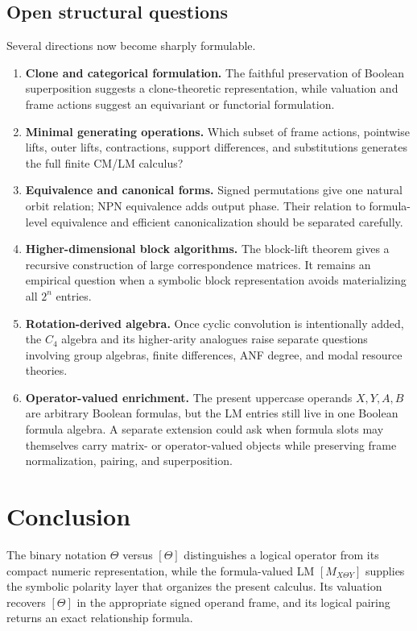 \documentclass[11pt]{article}
\theoremstyle{definition}
\theoremstyle{remark}
\begin{document}
\subsection{Open structural questions}

Several directions now become sharply formulable.
\begin{enumerate}
  \item \textbf{Clone and categorical formulation.}  The faithful preservation of Boolean superposition suggests a clone-theoretic representation, while valuation and frame actions suggest an equivariant or functorial formulation.
  \item \textbf{Minimal generating operations.}  Which subset of frame actions, pointwise lifts, outer lifts, contractions, support differences, and substitutions generates the full finite CM/LM calculus?
  \item \textbf{Equivalence and canonical forms.}  Signed permutations give one natural orbit relation; NPN equivalence adds output phase.  Their relation to formula-level equivalence and efficient canonicalization should be separated carefully.
  \item \textbf{Higher-dimensional block algorithms.}  The block-lift theorem gives a recursive construction of large correspondence matrices.  It remains an empirical question when a symbolic block representation avoids materializing all $2^n$ entries.
  \item \textbf{Rotation-derived algebra.}  Once cyclic convolution is intentionally added, the $C_4$ algebra and its higher-arity analogues raise separate questions involving group algebras, finite differences, ANF degree, and modal resource theories.
  \item \textbf{Operator-valued enrichment.}  The present uppercase operands $X,Y,A,B$ are arbitrary Boolean formulas, but the LM entries still live in one Boolean formula algebra.  A separate extension could ask when formula slots may themselves carry matrix- or operator-valued objects while preserving frame normalization, pairing, and superposition.
\end{enumerate}

\section{Conclusion}

The binary notation $\Theta$ versus $[\Theta]$ distinguishes a logical operator from its compact numeric representation, while the formula-valued LM $[M_{X\Theta Y}]$ supplies the symbolic polarity layer that organizes the present calculus.  Its valuation recovers $[\Theta]$ in the appropriate signed operand frame, and its logical pairing returns an exact relationship formula.
\end{document}

